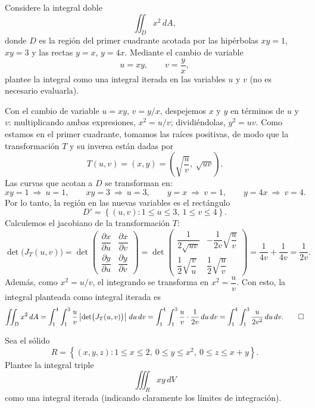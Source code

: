 \documentclass[11pt,respuestas,a4]{aleph-examen}
\begin{document}
\begin{preguntas}
\item
Considere la integral doble
\[
    \iint_D x^2\,dA,
\]
donde $D$ es la región del primer cuadrante acotada por las hipérbolas $xy = 1$, $xy = 3$ y las rectas $y = x$, $y = 4x$. Mediante el cambio de variable
\[
    u = xy,\qquad v = \frac{y}{x},
\]
{plantee} la integral como una integral iterada en las variables $u$ y $v$ (no es necesario evaluarla).

\begin{respuesta}
Con el cambio de variable $u = xy$, $v = y/x$, despejemos $x$ y $y$ en términos de $u$ y $v$: multiplicando ambas expresiones, $x^2 = u/v$; dividiéndolas, $y^2 = uv$. Como estamos en el primer cuadrante, tomamos las raíces positivas, de modo que la transformación $T$ y su inversa están dadas por
\[
    T(u,v) = (x,y) = \left(\sqrt{\frac{u}{v}},\ \sqrt{uv}\right).
\]
Las curvas que acotan a $D$ se transforman en:
\[
    xy = 1 \ \Rightarrow\ u = 1,
    \qquad
    xy = 3 \ \Rightarrow\ u = 3,
    \qquad
    y = x \ \Rightarrow\ v = 1,
    \qquad
    y = 4x \ \Rightarrow\ v = 4.
\]
Por lo tanto, la región en las nuevas variables es el rectángulo
\[
    D' = \left\{(u,v) : 1\le u\le 3,\ 1\le v\le 4\right\}.
\]
Calculemos el jacobiano de la transformación $T$:
\[
    \det\bigl(J_T(u,v)\bigr)
    =
    \det\begin{pmatrix}
        \dfrac{\partial x}{\partial u} & \dfrac{\partial x}{\partial v}\\[10pt]
        \dfrac{\partial y}{\partial u} & \dfrac{\partial y}{\partial v}
    \end{pmatrix}
    =
    \det\begin{pmatrix}
        \dfrac{1}{2\sqrt{uv}} & -\dfrac{1}{2v}\sqrt{\dfrac{u}{v}}\\[10pt]
        \dfrac{1}{2}\sqrt{\dfrac{v}{u}} & \dfrac{1}{2}\sqrt{\dfrac{u}{v}}
    \end{pmatrix}
    =
    \frac{1}{4v} + \frac{1}{4v}
    =
    \frac{1}{2v}.
\]
Además, como $x^2 = u/v$, el integrando se transforma en $x^2 = \dfrac{u}{v}$. Con esto, la integral planteada como integral iterada es
\[
    \iint_D x^2\,dA
    =
    \int_1^4 \int_1^3 \frac{u}{v}\left|\det\bigl(J_T(u,v)\bigr)\right|\,du\,dv
    =
    \int_1^4 \int_1^3 \frac{u}{v}\cdot\frac{1}{2v}\,du\,dv
    =
    \int_1^4 \int_1^3 \frac{u}{2v^2}\,du\,dv.\qedhere
\]
\end{respuesta}


\item
Sea el sólido
\[
    R = \left\{(x,y,z) : 1\le x\le 2,\ 0\le y\le x^2,\ 0\le z\le x+y\right\}.
\]
{Plantee} la integral triple
\[
    \iiint_R xy\,dV
\]
como una integral iterada (indicando claramente los límites de integración).


\end{preguntas}
\end{document}
